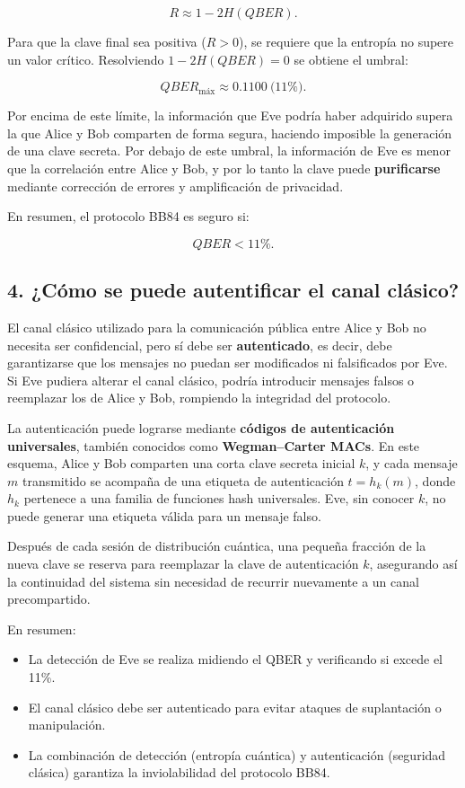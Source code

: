 \documentclass[12pt]{article}
\begin{document}
\[
R \approx 1 - 2H(QBER).
\]

Para que la clave final sea positiva ($R > 0$), se requiere que la entropía no supere un 
valor crítico. Resolviendo $1 - 2H(QBER) = 0$ se obtiene el umbral:

\[
QBER_{\text{máx}} \approx 0.1100 \ \text{(11\%)}.
\]

Por encima de este límite, la información que Eve podría haber adquirido supera la que 
Alice y Bob comparten de forma segura, haciendo imposible la generación de una clave secreta.  
Por debajo de este umbral, la información de Eve es menor que la correlación entre 
Alice y Bob, y por lo tanto la clave puede \textbf{purificarse} mediante corrección de errores 
y amplificación de privacidad.

En resumen, el protocolo BB84 es seguro si:

\[
QBER < 11\%.
\]

\subsection*{4. ¿Cómo se puede autentificar el canal clásico?}

El canal clásico utilizado para la comunicación pública entre Alice y Bob no necesita ser 
confidencial, pero sí debe ser \textbf{autenticado}, es decir, debe garantizarse que los 
mensajes no puedan ser modificados ni falsificados por Eve.  
Si Eve pudiera alterar el canal clásico, podría introducir mensajes falsos o reemplazar 
los de Alice y Bob, rompiendo la integridad del protocolo.

La autenticación puede lograrse mediante \textbf{códigos de autenticación universales}, 
también conocidos como \textbf{Wegman--Carter MACs}.  
En este esquema, Alice y Bob comparten una corta clave secreta inicial $k$, y cada mensaje 
$m$ transmitido se acompaña de una etiqueta de autenticación $t = h_k(m)$, donde 
$h_k$ pertenece a una familia de funciones hash universales.  
Eve, sin conocer $k$, no puede generar una etiqueta válida para un mensaje falso.

Después de cada sesión de distribución cuántica, una pequeña fracción de la nueva clave 
se reserva para reemplazar la clave de autenticación $k$, asegurando así la continuidad 
del sistema sin necesidad de recurrir nuevamente a un canal precompartido.

En resumen:
\begin{itemize}
    \item La detección de Eve se realiza midiendo el QBER y verificando si excede el 11\%.
    \item El canal clásico debe ser autenticado para evitar ataques de suplantación o manipulación.
    \item La combinación de detección (entropía cuántica) y autenticación (seguridad clásica) 
          garantiza la inviolabilidad del protocolo BB84.
\end{itemize}
\end{document}
